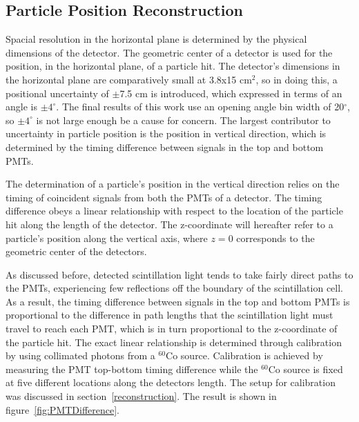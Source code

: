 \subsection{Particle Position Reconstruction}
Spacial resolution in the horizontal plane is determined by the physical dimensions of the detector.
The geometric center of a detector is used for the position, in the horizontal plane, of a particle hit.
The detector's dimensions in the horizontal plane are comparatively small at 3.8x15 cm$^2$, so in doing this, a positional uncertainty of $\pm$7.5 cm is introduced, which expressed in terms of an angle is $\pm4^{\circ}$.
The final results of this work use an opening angle bin width of 20$^{\circ}$, so $\pm4^{\circ}$ is not large enough be a cause for concern.
The largest contributor to uncertainty in particle position is the position in vertical direction, which is determined by the timing difference between signals in the top and bottom PMTs.

The determination of a particle's position in the vertical direction relies on the timing of coincident signals from both the PMTs of a detector.
The timing difference obeys a linear relationship with respect to the location of the particle hit along the length of the detector.
The z-coordinate will hereafter refer to a particle's position along the vertical axis, where $z=0$ corresponds to the geometric center of the detectors.

As discussed before, detected scintillation light tends to take fairly direct paths to the PMTs, experiencing few reflections off the boundary of the scintillation cell.
As a result, the timing difference between signals in the top and bottom PMTs is proportional to the difference in path lengths that the scintillation light must travel to reach each PMT, which is in turn proportional to the z-coordinate of the particle hit.
The exact linear relationship is determined through calibration by using collimated photons from a $^{60}$Co source.
Calibration is achieved by measuring the PMT top-bottom timing difference while the $^{60}$Co source is fixed at five different locations along the detectors length.
The setup for calibration was discussed in section~\ref{reconstruction}.
The result is shown in figure~\ref{fig:PMTDifference}.

